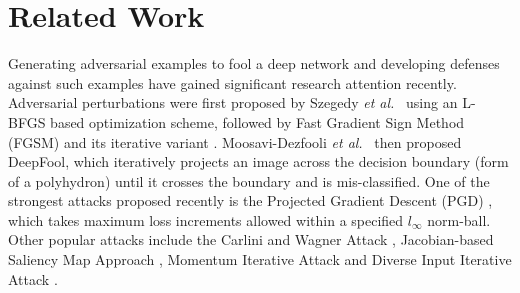 \documentclass[10pt,twocolumn,letterpaper]{article}
\begin{document}
\section{Related Work}
\label{sec:related-work}

Generating adversarial examples to fool a deep network and developing defenses against such examples have gained significant research attention recently. Adversarial perturbations were first proposed by Szegedy \textit{et al.}\ \cite{szegedy2013intriguing} using an L-BFGS based optimization scheme, followed by Fast Gradient Sign Method (FGSM) \cite{43405} and its iterative variant \cite{kurakin2016adversarial}. Moosavi-Dezfooli \textit{et al.}\ \cite{moosavi2016deepfool} then proposed DeepFool, which iteratively projects an image across the decision boundary (form of a polyhydron) until it crosses the boundary and is mis-classified. One of the strongest attacks proposed recently is the Projected Gradient Descent (PGD) \cite{madry2017towards}, which takes maximum loss increments allowed within a specified $l_\infty$ norm-ball. Other popular attacks include the Carlini and Wagner Attack \cite{carlini2017towards}, Jacobian-based Saliency Map Approach \cite{papernot2016limitations}, Momentum Iterative Attack \cite{dong2018boosting} and Diverse Input Iterative Attack \cite{xie2018improving}.
\end{document}

